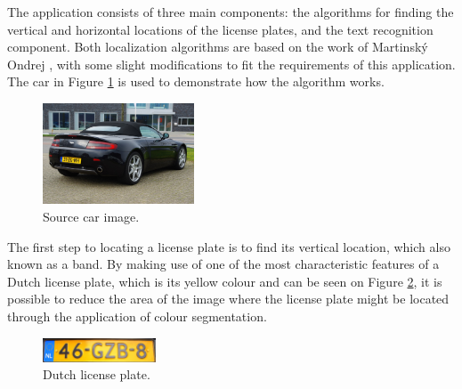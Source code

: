 

The application consists of three main components: the algorithms for finding the vertical and horizontal locations of the license plates, and the text recognition component. Both localization algorithms are based on the work of Martinský Ondrej \cite{javaanpr}, with some slight modifications to fit the requirements of this application. The car in Figure \ref{fig:car-source} is used to demonstrate how the algorithm works.

\begin{figure}[ht]
    \centering
    \includegraphics[width=0.40\textwidth]{plaatjes/car}
    \caption{Source car image.}
    \label{fig:car-source}
\end{figure}%


The first step to locating a license plate is to find its vertical location, which also known as a band. By making use of one of the most characteristic features of a Dutch license plate, which is its yellow colour and can be seen on Figure \ref{fig:dutch-plate}, it is possible to reduce the area of the image where the license plate might be located through the application of colour segmentation. 

\begin{figure}[h]
    \centering
    \includegraphics[width=0.3\textwidth]{plaatjes/dutch-plate}
    \caption{Dutch license plate.}
    \label{fig:dutch-plate}
\end{figure}

